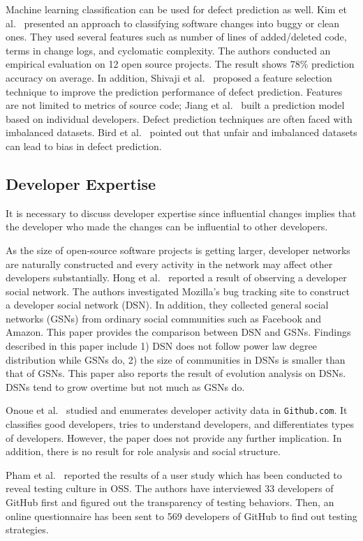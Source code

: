 Machine learning classification can be used for defect prediction as well. Kim
et al.~\cite{kim_classifying_2008} presented an approach to classifying
software changes into buggy or clean ones. They used several features such as number of
lines of added/deleted code, terms in change logs, and cyclomatic complexity.
The authors conducted an empirical evaluation on 12 open source projects. The
result shows 78\% prediction accuracy on average. In addition, Shivaji et
al.~\cite{shivaji_reducing_2009} proposed a feature selection technique to
improve the prediction performance of defect prediction. Features are not
limited to metrics of source code; Jiang et al.~\cite{jiang_personalized_2013}
built a prediction model based on individual developers. Defect prediction
techniques are often faced with imbalanced datasets. Bird et
al.~\cite{bird_fair_2009} pointed out that unfair and imbalanced datasets can
lead to bias in defect prediction.


\subsection{Developer Expertise}

It is necessary to discuss developer expertise since influential changes implies
that the developer who made the changes can be influential to other developers.

As the size of open-source software projects is getting larger, developer
networks are naturally constructed and every activity in the network may affect
other developers substantially. Hong et al.~\cite{hong_understanding_2011}
reported a result of observing a developer social network. The authors
investigated Mozilla's bug tracking site to construct a developer social network
(DSN). In addition, they collected general social networks (GSNs) from ordinary
social communities such as Facebook and Amazon. This paper provides the
comparison between DSN and GSNs. Findings described in this paper include 1) DSN
does not follow power law degree distribution while GSNs do, 2) the size of
communities in DSNs is smaller than that of GSNs. This paper also reports the
result of evolution analysis on DSNs. DSNs tend to grow overtime but not much as
GSNs do.

Onoue et al.~\cite{onoue_study_2013} studied and enumerates developer activity
data in \texttt{Github.com}.
It classifies good developers, tries to understand developers, and
differentiates types of developers. However, the paper does not provide any
further implication. In addition, there is no result for role analysis and 
social structure.

Pham et al.~\cite{pham_creating_2013} reported the results of a user study which
has been conducted to reveal testing culture in OSS. The authors have
interviewed 33 developers of GitHub first and figured out the transparency of
testing behaviors. Then, an online questionnaire has been sent to 569 developers
of GitHub to find out testing strategies.
